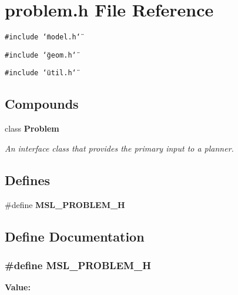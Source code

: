 \section{problem.h File Reference}
\label{problem_8h}
{\tt \#include \char`\"{}model.h\char`\"{}}\par
{\tt \#include \char`\"{}geom.h\char`\"{}}\par
{\tt \#include \char`\"{}util.h\char`\"{}}\par
\subsection*{Compounds}
\begin{CompactItemize}
\item 
class {\bf Problem}
\begin{CompactList}\small\item\em An interface class that provides the primary input to a planner.\item\end{CompactList}\end{CompactItemize}
\subsection*{Defines}
\begin{CompactItemize}
\item 
\#define {\bf MSL\_\-PROBLEM\_\-H}
\end{CompactItemize}


\subsection{Define Documentation}
\subsubsection{\setlength{\rightskip}{0pt plus 5cm}\#define MSL\_\-PROBLEM\_\-H}\label{problem_8h_a0}


{\bf Value:}\footnotesize\begin{verbatim}
\end{verbatim}\normalsize 
